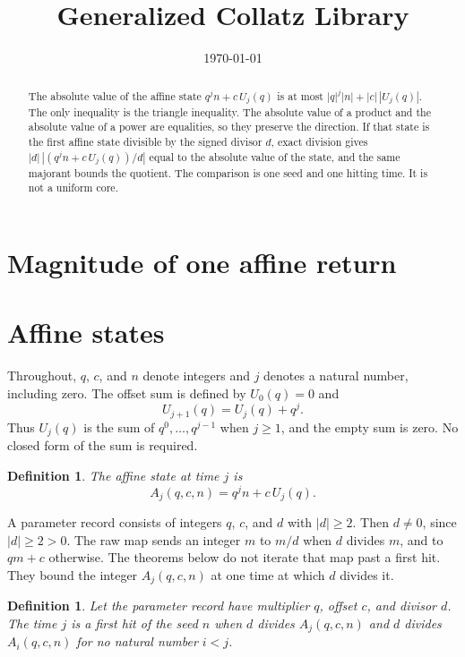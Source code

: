 \documentclass[11pt,letterpaper]{article}
\title{Generalized Collatz Library}
\author{}
\date{\today}
\newtheorem{definition}[theorem]{Definition}
\begin{document}
\maketitle
\section*{Magnitude of one affine return}

\begin{abstract}
The absolute value of the affine state \(q^{j}n+c\,U_{j}(q)\) is at most
\(|q|^{j}|n|+|c|\,|U_{j}(q)|\). The only inequality is the triangle inequality.
The absolute value of a product and the absolute value of a power are
equalities, so they preserve the direction. If that state is the first affine
state divisible by the signed divisor \(d\), exact division gives
\(|d|\,|(q^{j}n+c\,U_{j}(q))/d|\) equal to the absolute value of the state, and
the same majorant bounds the quotient. The comparison is one seed and one
hitting time. It is not a uniform core.
\end{abstract}

\section{Affine states}

Throughout, \(q\), \(c\), and \(n\) denote integers and \(j\) denotes a natural
number, including zero. The offset sum is defined by \(U_{0}(q)=0\) and
\[
U_{j+1}(q)=U_{j}(q)+q^{j}.
\]
Thus \(U_{j}(q)\) is the sum of \(q^{0},\ldots,q^{j-1}\) when \(j\ge 1\), and
the empty sum is zero. No closed form of the sum is required.

\begin{definition}
\label{def:affine-state}
The \emph{affine state} at time \(j\) is
\[
A_{j}(q,c,n)=q^{j}n+c\,U_{j}(q).
\]
\end{definition}

A parameter record consists of integers \(q\), \(c\), and \(d\) with
\(|d|\ge 2\). Then \(d\neq 0\), since \(|d|\ge 2>0\). The raw map sends an
integer \(m\) to \(m/d\) when \(d\) divides \(m\), and to \(qm+c\) otherwise.
The theorems below do not iterate that map past a first hit. They bound the
integer \(A_{j}(q,c,n)\) at one time at which \(d\) divides it.

\begin{definition}
\label{def:first-hit}
Let the parameter record have multiplier \(q\), offset \(c\), and divisor
\(d\). The time \(j\) is a \emph{first hit} of the seed \(n\) when
\(d\) divides \(A_{j}(q,c,n)\) and \(d\) divides \(A_{i}(q,c,n)\) for no
natural number \(i<j\).
\end{definition}
\end{document}
